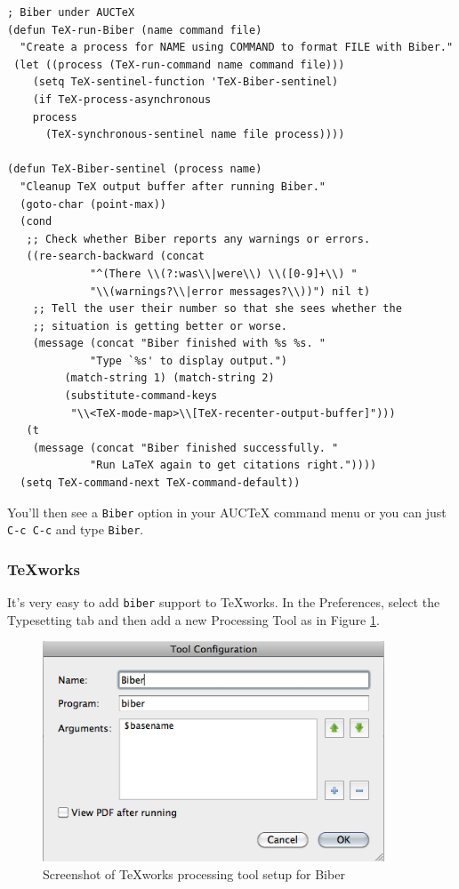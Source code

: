 \documentclass{ltxdockit}
\begin{document}
\begin{verbatim}
; Biber under AUCTeX
(defun TeX-run-Biber (name command file)
  "Create a process for NAME using COMMAND to format FILE with Biber." 
 (let ((process (TeX-run-command name command file)))
    (setq TeX-sentinel-function 'TeX-Biber-sentinel)
    (if TeX-process-asynchronous
	process
      (TeX-synchronous-sentinel name file process))))

(defun TeX-Biber-sentinel (process name)
  "Cleanup TeX output buffer after running Biber."
  (goto-char (point-max))
  (cond
   ;; Check whether Biber reports any warnings or errors.
   ((re-search-backward (concat
			 "^(There \\(?:was\\|were\\) \\([0-9]+\\) "
			 "\\(warnings?\\|error messages?\\))") nil t)
    ;; Tell the user their number so that she sees whether the
    ;; situation is getting better or worse.
    (message (concat "Biber finished with %s %s. "
		     "Type `%s' to display output.")
	     (match-string 1) (match-string 2)
	     (substitute-command-keys
	      "\\<TeX-mode-map>\\[TeX-recenter-output-buffer]")))
   (t
    (message (concat "Biber finished successfully. "
		     "Run LaTeX again to get citations right."))))
  (setq TeX-command-next TeX-command-default))
\end{verbatim}

\noindent You'll then see a \verb+Biber+ option in your AUCTeX command menu or
you can just \verb+C-c C-c+ and type \verb+Biber+.

\subsubsection{TeXworks}

It's very easy to add \verb+biber+ support to TeXworks. In the Preferences,
select the Typesetting tab and then add a new Processing Tool as in Figure
\ref{fig:biber-texworks}.

\begin{figure}[!htbp]
  \centering
  \includegraphics[width=4in,keepaspectratio=true]{biber-texworks.png}
  \caption{Screenshot of TeXworks processing tool setup for Biber}
  \label{fig:biber-texworks}
\end{figure}
\end{document}
